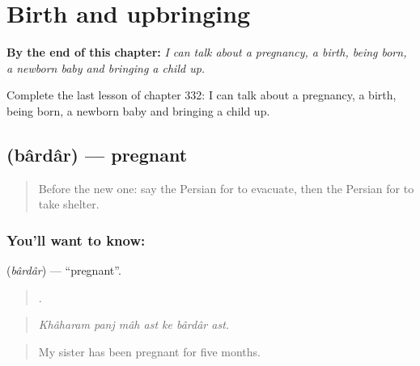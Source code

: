 
\chapter{Birth and upbringing}
\label{ch:fa-birth-and-upbringing}

\begin{chapteropening}
\textbf{By the end of this chapter:} \emph{I can talk about a pregnancy, a birth, being born, a newborn baby and bringing a child up.}

Complete the last lesson of chapter 332: I can talk about a pregnancy, a birth, being born, a newborn baby and bringing a child up.
\end{chapteropening}

\section[\texorpdfstring{\fa{باردار} (bârdâr)}{باردار (bârdâr)}]{ (bârdâr) — pregnant}

\label{lesson:FA-C332-bardar}



\begin{quote}
Before the new one: say the Persian for to evacuate, then the Persian for to take shelter.
\end{quote}

\subsection*{You'll want to know: }
\textbf{} (\emph{bârdâr}) — \textquotedblleft{}pregnant\textquotedblright{}.

\begin{quote}
      .
\end{quote}

\begin{quote}
\emph{Khâharam panj mâh ast ke bârdâr ast.}
\end{quote}

\begin{quote}
My sister has been pregnant for five months.
\end{quote}

